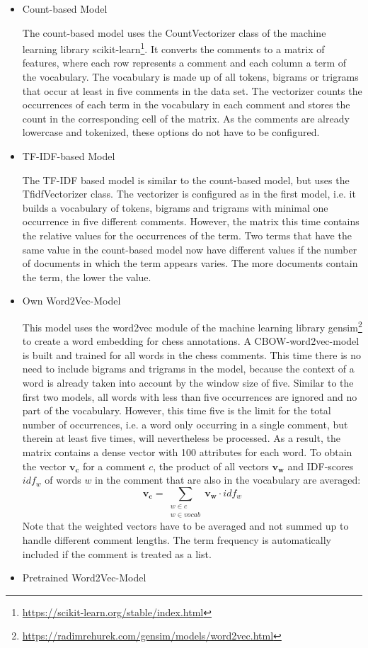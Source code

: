 \documentclass[article,type=msc,colorback,accentcolor=tud7b]{tudthesis}
\begin{document}
    \begin{itemize}
      \item Count-based Model

        The count-based model uses the CountVectorizer class of the machine learning library scikit-learn\footnote{\url{https://scikit-learn.org/stable/index.html}}. It converts the comments to a matrix of features, where each row represents a comment and each column a term of the vocabulary. The vocabulary is made up of all tokens, bigrams or trigrams that occur at least in five comments in the data set. The vectorizer counts the occurrences of each term in the vocabulary in each comment and stores the count in the corresponding cell of the matrix. As the comments are already lowercase and tokenized, these options do not have to be configured.
      \item TF-IDF-based Model

        The TF-IDF based model is similar to the count-based model, but uses the TfidfVectorizer class. The vectorizer is configured as in the first model, i.e. it builds a vocabulary of tokens, bigrams and trigrams with minimal one occurrence in five different comments. However, the matrix this time contains the relative values for the occurrences of the term. Two terms that have the same value in the count-based model now have different values if the number of documents in which the term appears varies. The more documents contain the term, the lower the value.
      \item Own Word2Vec-Model

        This model uses the word2vec module of the machine learning library gensim\footnote{\url{https://radimrehurek.com/gensim/models/word2vec.html}} to create a word embedding for chess annotations. A CBOW-word2vec-model is built and trained for all words in the chess comments. This time there is no need to include bigrams and trigrams in the model, because the context of a word is already taken into account by the window size of five. Similar to the first two models, all words with less than five occurrences are ignored and no part of the vocabulary. However, this time five is the limit for the total number of occurrences, i.e. a word only occurring in a single comment, but therein at least five times, will nevertheless be processed. As a result, the matrix contains a dense vector with 100 attributes for each word. To obtain the vector $\mathbf{v_{c}}$ for a comment $c$, the product of all vectors $\mathbf{v_{w}}$ and IDF-scores $idf_{w}$ of words $w$ in the comment that are also in the vocabulary are averaged:
        \[\mathbf{v_{c}}=\sum_{\substack{w\in c\\w\in vocab}}\mathbf{v_{w}}\cdot idf_{w}\]
        Note that the weighted vectors have to be averaged and not summed up to handle different comment lengths. The term frequency is automatically included if the comment is treated as a list.
      \item Pretrained Word2Vec-Model


\end{itemize}
\end{document}
